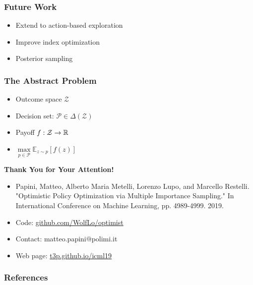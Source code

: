 \documentclass[aspectratio=169, table]{beamer}
\newcommand{\enb}[1]{\textcolor{poliblue1}{\textbf{#1}}}
\begin{document}
\begin{frame}
\begin{columns}
\begin{column}{.45\textwidth}
\begin{figure}
		\end{figure}
	\end{column}
\end{columns}
\end{frame}

\begin{frame}
\frametitle{Future Work}
\begin{itemize}
	\setlength{\itemsep}{20pt}
	\item Extend to action-based exploration
	\item Improve index optimization
	\item Posterior sampling~\cite{thompson1933likelihood}
\end{itemize}
\end{frame}

\begin{frame}
\frametitle{The Abstract Problem~\cite{chu2019probability}}
	\begin{itemize}
		\setlength{\itemsep}{20pt}
		\item Outcome space $\mathcal{Z}$ 
		\item Decision set: $\mathcal{P}\in\Delta(\mathcal{Z})$
		\item Payoff $f:\mathcal{Z}\to\mathbb{R}$
		\item $\max\limits_{p\in\mathcal{P}}\mathbb{E}_{z\sim p}\left[f(z)\right]$
	\end{itemize}
\end{frame}

\begin{frame}[plain]
\begin{center}
	\huge{\enb{Thank You for Your Attention!}}
\end{center}

	\begin{itemize}
		\setlength{\itemsep}{20pt}
		\item[] Papini, Matteo, Alberto Maria Metelli, Lorenzo Lupo, and Marcello Restelli. "Optimistic Policy Optimization via Multiple Importance Sampling." In International Conference on Machine Learning, pp. 4989-4999. 2019.
		\item[] Code: \url{github.com/WolfLo/optimist}
		\item[] Contact: matteo.papini@polimi.it
		\item[] Web page: \url{t3p.github.io/icml19} 
	\end{itemize}
\end{frame}


\begin{frame}
\frametitle{References}


\end{frame}

\end{document}
